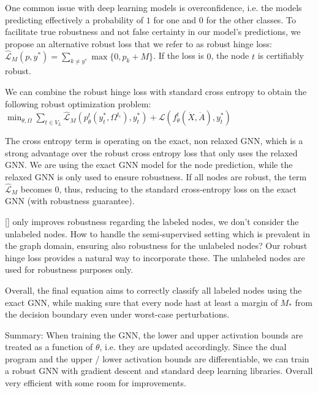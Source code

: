 \documentclass[a4paper,preprint]{sig-alternate}
\begin{document}
One common issue with deep learning models is overconfidence, i.e. the models predicting effectively a probability of $1$ for one and $0$ for the other
classes. To facilitate true robustness and not false certainty in our model's predictions, we propose an alternative robust loss that we refer to
as robust hinge loss: $\mathcal{\hat{L}}_M (p, y^{\ast}) = \sum_{k \neq y^{\ast}} \max \{0, p_k + M\}$. If the loss is $0$, the node $t$
is certifiably robust.\newline

We can combine the robust hinge loss with standard cross entropy to obtain the following robust optimization problem:\newline
$\min_{\theta, \Omega} \sum_{t \in V_L} \mathcal{\hat{L}}_M (p_{\theta}^t (y_t^{\ast}, \Omega^{t_i}), y_t^{\ast}) + \mathcal{L} (f_{\theta}^t (\dot{X}, 
\dot{A}), y_t^{\ast})$\newline

The cross entropy term is operating on the exact, non relaxed GNN, which is a strong advantage over the robust cross entropy loss that only uses the relaxed GNN.
We are using the exact GNN model for the node prediction, while the relaxed GNN is only used to ensure robustness. If all nodes are robust, the term
$\mathcal{\hat{L}}_M$ becomes $0$, thus, reducing to the standard cross-entropy loss on the exact GNN (with robustness guarantee).\newline

\ref{} only improves robustness regarding the labeled nodes, we don't consider the unlabeled nodes. How to handle the semi-supervised setting
which is prevalent in the graph domain, ensuring also robustness for the unlabeled nodes? Our robust hinge loss provides a natural way to
incorporate these. The unlabeled nodes are used for robustness purposes only.\newline

Overall, the final equation aims to correctly classify all labeled nodes using the exact GNN, while making sure that every node hast at least a
margin of $M_{\ast}$ from the decision boundary even under worst-case perturbations.\newline

Summary: When training the GNN, the lower and upper activation bounds are treated as a function of $\theta$, i.e. they are updated accordingly.
Since the dual program and the upper / lower activation bounds are differentiable, we can train a robust GNN with gradient descent and standard
deep learning libraries. Overall very efficient with some room for improvements.\newline
\end{document}
